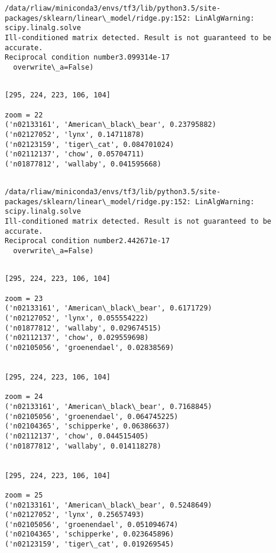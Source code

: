 \documentclass[11pt]{article}
\begin{document}
    \begin{Verbatim}[commandchars=\\\{\}]
/data/rliaw/miniconda3/envs/tf3/lib/python3.5/site-packages/sklearn/linear\_model/ridge.py:152: LinAlgWarning: scipy.linalg.solve
Ill-conditioned matrix detected. Result is not guaranteed to be accurate.
Reciprocal condition number3.099314e-17
  overwrite\_a=False)

    \end{Verbatim}

    \begin{Verbatim}[commandchars=\\\{\}]

[295, 224, 223, 106, 104]

zoom = 22
('n02133161', 'American\_black\_bear', 0.23795882)
('n02127052', 'lynx', 0.14711878)
('n02123159', 'tiger\_cat', 0.084701024)
('n02112137', 'chow', 0.05704711)
('n01877812', 'wallaby', 0.041595668)


    \end{Verbatim}

    \begin{Verbatim}[commandchars=\\\{\}]
/data/rliaw/miniconda3/envs/tf3/lib/python3.5/site-packages/sklearn/linear\_model/ridge.py:152: LinAlgWarning: scipy.linalg.solve
Ill-conditioned matrix detected. Result is not guaranteed to be accurate.
Reciprocal condition number2.442671e-17
  overwrite\_a=False)

    \end{Verbatim}

    \begin{Verbatim}[commandchars=\\\{\}]

[295, 224, 223, 106, 104]

zoom = 23
('n02133161', 'American\_black\_bear', 0.6171729)
('n02127052', 'lynx', 0.055554222)
('n01877812', 'wallaby', 0.029674515)
('n02112137', 'chow', 0.029559698)
('n02105056', 'groenendael', 0.02838569)


[295, 224, 223, 106, 104]

zoom = 24
('n02133161', 'American\_black\_bear', 0.7168845)
('n02105056', 'groenendael', 0.064745225)
('n02104365', 'schipperke', 0.06386637)
('n02112137', 'chow', 0.044515405)
('n01877812', 'wallaby', 0.014118278)


[295, 224, 223, 106, 104]

zoom = 25
('n02133161', 'American\_black\_bear', 0.5248649)
('n02127052', 'lynx', 0.25657493)
('n02105056', 'groenendael', 0.051094674)
('n02104365', 'schipperke', 0.023645896)
('n02123159', 'tiger\_cat', 0.019269545)


    \end{Verbatim}
\end{document}
